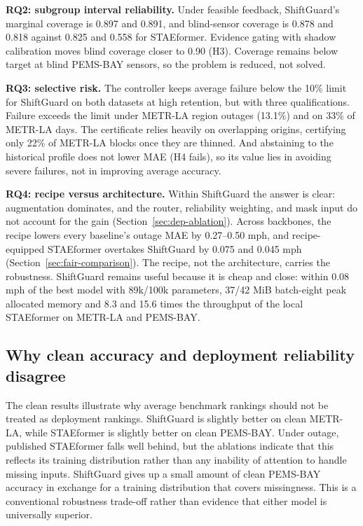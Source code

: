 \documentclass[preprint,12pt]{elsarticle}
\begin{document}
\textbf{RQ2: subgroup interval reliability.} Under feasible feedback, ShiftGuard's
marginal coverage is 0.897 and 0.891, and blind-sensor coverage is 0.878 and 0.818
against 0.825 and 0.558 for STAEformer. Evidence gating with shadow calibration
moves blind coverage closer to 0.90 (H3). Coverage remains below target at blind
PEMS-BAY sensors, so the problem is reduced, not solved.

\textbf{RQ3: selective risk.} The controller keeps average failure below the 10\% limit for
ShiftGuard on both datasets at high retention, but with three qualifications. Failure
exceeds the limit under METR-LA region outages (13.1\%) and on 33\% of METR-LA days.
The certificate relies heavily on overlapping origins, certifying only 22\% of
METR-LA blocks once they are thinned. And abstaining to the historical profile does
not lower MAE (H4 fails), so its value lies in avoiding severe failures, not in
improving average accuracy.

\textbf{RQ4: recipe versus architecture.} Within ShiftGuard the answer is clear:
augmentation dominates, and the router, reliability weighting, and mask input do
not account for the gain (Section~\ref{sec:dep-ablation}). Across backbones,
the recipe lowers every baseline's outage MAE by 0.27--0.50 mph, and
recipe-equipped STAEformer overtakes ShiftGuard by 0.075 and 0.045 mph
(Section~\ref{sec:fair-comparison}). The recipe, not the architecture, carries the
robustness. ShiftGuard remains useful because it is cheap and close: within
0.08 mph of the best model with 89k/100k parameters, 37/42 MiB batch-eight peak
allocated memory and 8.3 and 15.6 times the throughput of the local STAEformer on
METR-LA and PEMS-BAY.

\subsection{Why clean accuracy and deployment reliability disagree}
The clean results illustrate why average benchmark rankings should not be
treated as deployment rankings. ShiftGuard is slightly better on clean METR-LA,
while STAEformer is slightly better on clean PEMS-BAY. Under outage, published
STAEformer falls well behind, but the ablations indicate that this reflects its
training distribution rather than any inability of attention to handle missing
inputs. ShiftGuard gives up a small amount of clean PEMS-BAY accuracy in exchange
for a training distribution that covers missingness. This is a conventional
robustness trade-off rather than evidence that either model is universally
superior.
\end{document}
